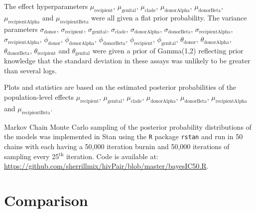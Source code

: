 \documentclass[12pt]{article}
\begin{document}
The effect hyperparameters
$\mu_{\text{recipient}}$, $\mu_{\text{genital}}$, $\mu_{\text{clade}}$, $\mu_{\text{donorAlpha}}$, $\mu_{\text{donorBeta}}$, $\mu_{\text{recipientAlpha}}$ and $\mu_{\text{recipientBeta}}$ were all given a flat prior probability.
The variance parameters 
$\sigma_{\text{donor}}$, $\sigma_{\text{recipient}}$, $\sigma_{\text{genital}}$, $\sigma_{\text{clade}}$, $\sigma_{\text{donorAlpha}}$, $\sigma_{\text{donorBeta}}$, $\sigma_{\text{recipientAlpha}}$, $\sigma_{\text{recipientAlpha}}$,
$\phi_{\text{donor}}$, $\phi_{\text{donorAlpha}}$, $\phi_{\text{donorBeta}}$, $\phi_{\text{recipient}}$, $\phi_{\text{genital}}$,
$\theta_{\text{donor}}$, $\theta_{\text{donorAlpha}}$, $\theta_{\text{donorBeta}}$, $\theta_{\text{recipient}}$ and $\theta_{\text{genital}}$ 
were given a prior of Gamma(1,2) reflecting prior knowledge that the standard deviation in these assays was unlikely to be greater than several logs.

Plots and statistics are based on the estimated posterior probabilities of the population-level effects
$\mu_{\text{recipient}}$, $\mu_{\text{genital}}$, $\mu_{\text{clade}}$, $\mu_{\text{donorAlpha}}$, $\mu_{\text{donorBeta}}$, $\mu_{\text{recipientAlpha}}$ and $\mu_{\text{recipientBeta}}$.

Markov Chain Monte Carlo sampling of the posterior probability distributions of the models was implemented in Stan using the \texttt{R} package \texttt{rstan}
  and run in 50 chains with each having a 50,000 iteration burnin and 50,000 iterations of sampling every 25$^{\text{th}}$ iteration.
  Code is available at:\\
  \url{https://github.com/sherrillmix/hivPair/blob/master/bayesIC50.R}.

\section{Comparison}
\end{document}
